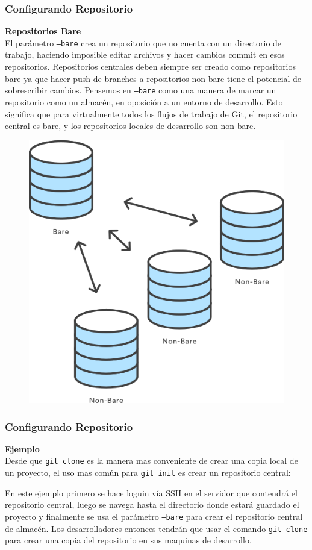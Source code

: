 \documentclass[8pt]{beamer}
\begin{document}
\begin{frame}
\frametitle{Configurando Repositorio}
\textbf{Repositorios Bare}\\
\medskip
El par\'ametro \texttt{--bare} crea un repositorio que no cuenta con un directorio de trabajo, haciendo imposible editar archivos y hacer cambios commit en esos repositorios. Repositorios centrales deben siempre ser creado como repositorios bare ya que hacer push de branches a repositorios non-bare tiene el potencial de sobrescribir cambios. Pensemos en \texttt{--bare} como una manera de marcar un repositorio como un almac\'en, en oposici\'on a un entorno de desarrollo. Esto significa que para virtualmente todos los flujos de trabajo de Git, el repositorio central es bare, y los repositorios locales de desarrollo son non-bare.\\
\medskip
\begin{figure}[h]
\includegraphics[scale=0.35]{imagenes/01.png}
\centering
\end{figure}
\end{frame}

\begin{frame}
\frametitle{Configurando Repositorio}
\textbf{Ejemplo}\\
Desde que \texttt{git clone} es la manera mas conveniente de crear una copia local de un proyecto, el uso mas com\'un para \texttt{git init} es crear un repositorio central:

En este ejemplo primero se hace loguin v\'ia SSH en el servidor que contendr\'a el repositorio central, luego se navega hasta el directorio donde estar\'a guardado el proyecto y finalmente se usa el par\'ametro \texttt{--bare} para crear el repositorio central de almac\'en. Los desarrolladores entonces tendr\'an que usar el comando \texttt{git clone} para crear una copia del repositorio en sus maquinas de desarrollo.
\end{frame}
\end{document}
